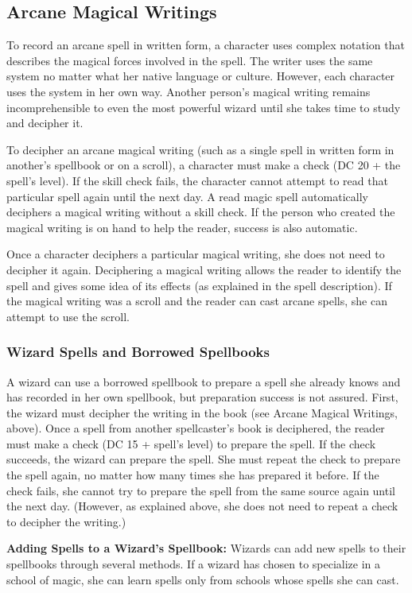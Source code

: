 \subsection{Arcane Magical Writings}
To record an arcane spell in written form, a character uses complex notation that describes the magical forces involved in the spell. The writer uses the same system no matter what her native language or culture. However, each character uses the system in her own way. Another person's magical writing remains incomprehensible to even the most powerful wizard until she takes time to study and decipher it.

To decipher an arcane magical writing (such as a single spell in written form in another's spellbook or on a scroll), a character must make a  check (DC 20 + the spell's level). If the skill check fails, the character cannot attempt to read that particular spell again until the next day. A read magic spell automatically deciphers a magical writing without a skill check. If the person who created the magical writing is on hand to help the reader, success is also automatic.

Once a character deciphers a particular magical writing, she does not need to decipher it again. Deciphering a magical writing allows the reader to identify the spell and gives some idea of its effects (as explained in the spell description). If the magical writing was a scroll and the reader can cast arcane spells, she can attempt to use the scroll.

\subsubsection{Wizard Spells and Borrowed Spellbooks}
A wizard can use a borrowed spellbook to prepare a spell she already knows and has recorded in her own spellbook, but preparation success is not assured. First, the wizard must decipher the writing in the book (see Arcane Magical Writings, above). Once a spell from another spellcaster's book is deciphered, the reader must make a  check (DC 15 + spell's level) to prepare the spell. If the check succeeds, the wizard can prepare the spell. She must repeat the check to prepare the spell again, no matter how many times she has prepared it before. If the check fails, she cannot try to prepare the spell from the same source again until the next day. (However, as explained above, she does not need to repeat a check to decipher the writing.)

\textbf{Adding Spells to a Wizard's Spellbook:} Wizards can add new spells to their spellbooks through several methods. If a wizard has chosen to specialize in a school of magic, she can learn spells only from schools whose spells she can cast.

